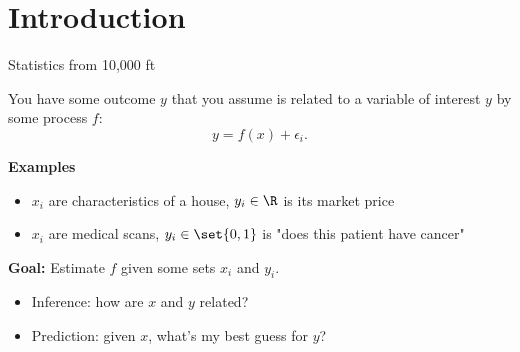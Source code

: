 \section{Introduction}

\begin{frame}{Statistics from 10,000 ft}

	You have some outcome $y$ that you assume is related to a variable of interest $y$ by some process $f$:
	\begin{equation}
		y = f(x) + \epsilon_i.
	\end{equation}

	\pause \bigskip

	\textbf{Examples}

	\begin{itemize}
		\item ${x_i}$ are characteristics of a house, ${y_i} \in \R$ is its market price
		\item ${x_i}$ are medical scans, ${y_i} \in \set{0, 1}$ is "does this patient have cancer"
	\end{itemize}

	\pause \bigskip

	\textbf{Goal:} Estimate $f$ given some sets ${x_i}$ and ${y_i}$.

	\begin{itemize}
		\item Inference: how are $x$ and $y$ related?
		\item Prediction: given $x$, what's my best guess for $y$?
	\end{itemize}
\end{frame}

